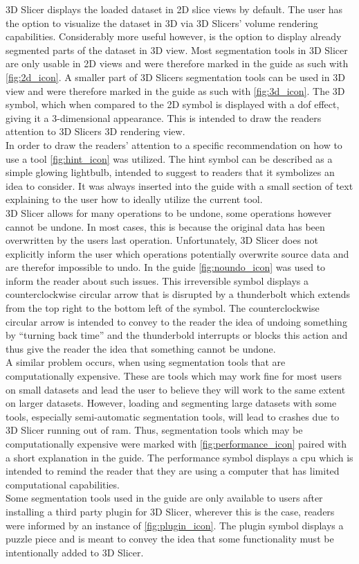 \noindent
3D Slicer displays the loaded dataset in 2D slice views by default.
The user has the option to visualize the dataset in 3D via 3D Slicers' volume rendering capabilities.
Considerably more useful however, is the option to display already segmented parts of the dataset in 3D view.
Most segmentation tools in 3D Slicer are only usable in 2D views and were therefore marked in the guide as such with \cref{fig:2d_icon}.
A smaller part of 3D Slicers segmentation tools can be used in 3D view and were therefore marked in the guide as such with \cref{fig:3d_icon}.
The 3D symbol, which when compared to the 2D symbol is displayed with a \acrfull{dof} effect, giving it a 3-dimensional appearance.
This is intended to draw the readers attention to 3D Slicers 3D rendering view.\\
In order to draw the readers' attention to a specific recommendation on how to use a tool \cref{fig:hint_icon} was utilized.
The hint symbol can be described as a simple glowing lightbulb, intended to suggest to readers that it symbolizes an idea to consider.
It was always inserted into the guide with a small section of text explaining to the user how to ideally utilize the current tool.\\
3D Slicer allows for many operations to be undone, some operations however cannot be undone.
In most cases, this is because the original data has been overwritten by the users last operation.
Unfortunately, 3D Slicer does not explicitly inform the user which operations potentially overwrite source data and are therefor impossible to undo.
In the guide \cref{fig:noundo_icon} was used to inform the reader about such issues.
This irreversible symbol displays a counterclockwise circular arrow that is disrupted by a thunderbolt which extends from the top right to the bottom left of the symbol.
The counterclockwise circular arrow is intended to convey to the reader the idea of undoing something by ``turning back time'' and the thunderbold interrupts or blocks this action and thus give the reader the idea that something cannot be undone.\\
A similar problem occurs, when using segmentation tools that are computationally expensive.
These are tools which may work fine for most users on small datasets and lead the user to believe they will work to the same extent on larger datasets.
However, loading and segmenting large datasets with some tools, especially semi-automatic segmentation tools, will lead to crashes due to 3D Slicer running out of \acrfull{ram}.
Thus, segmentation tools which may be computationally expensive were marked with \cref{fig:performance_icon} paired with a short explanation in the guide.
The performance symbol displays a \acrfull{cpu} which is intended to remind the reader that they are using a computer that has limited computational capabilities.\\
Some segmentation tools used in the guide are only available to users after installing a third party plugin for 3D Slicer, wherever this is the case, readers were informed by an instance of \cref{fig:plugin_icon}.
The plugin symbol displays a puzzle piece and is meant to convey the idea that some functionality must be intentionally added to 3D Slicer.
